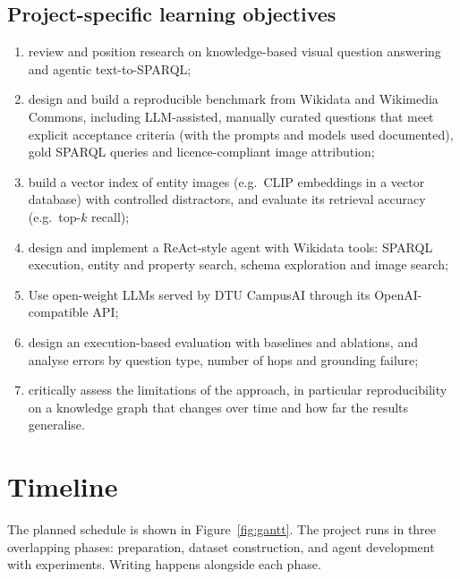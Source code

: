 \documentclass[a4paper,11pt]{article}
\newif\ifshowsupervisorq
\newcommand{\supervisorq}[1]{%
  \ifshowsupervisorq
  \begin{supervisorqbox}#1
  \end{supervisorqbox}%
  \fi
}
\begin{document}
\supervisorq{The cross-disciplinary teamwork part of objective 8 is not
entirely connected to an individual project. Could it be left out?}

\subsection{Project-specific learning objectives}

\begin{enumerate}
  \item review and position research on knowledge-based visual question
    answering and agentic text-to-SPARQL;
  \item design and build a reproducible benchmark from Wikidata and Wikimedia
    Commons, including LLM-assisted, manually curated questions that meet
    explicit acceptance criteria (with the prompts and models used
    documented), gold SPARQL queries and licence-compliant image attribution;
  \item build a vector index of entity images (e.g.\ CLIP embeddings in a
    vector database) with controlled distractors, and evaluate its retrieval
    accuracy (e.g.\ top-$k$ recall);
  \item design and implement a ReAct-style agent with Wikidata tools: SPARQL
    execution, entity and property search, schema exploration and image
    search;
  \item Use open-weight LLMs served by DTU CampusAI through its
    OpenAI-compatible API;
  \item design an execution-based evaluation with baselines and ablations,
    and analyse errors by question type, number of hops and grounding
    failure;
  \item critically assess the limitations of the approach, in particular
    reproducibility on a knowledge graph that changes over time and how far
    the results generalise.
\end{enumerate}

\supervisorq{Is 5. ok?}
\section{Timeline}

The planned schedule is shown in Figure~\ref{fig:gantt}. The project runs in
three overlapping phases: preparation, dataset construction, and agent
development with experiments. Writing happens alongside each phase.
\end{document}
